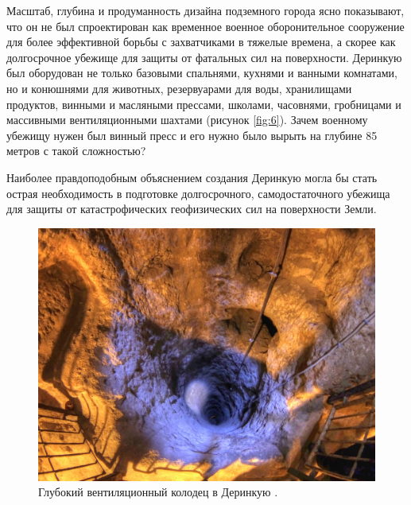 \documentclass[10pt,twocolumn,letterpaper]{article}
\begin{document}
Масштаб, глубина и продуманность дизайна подземного города ясно показывают, что он не был спроектирован как временное военное оборонительное сооружение для более эффективной борьбы с захватчиками в тяжелые времена, а скорее как долгосрочное убежище для защиты от фатальных сил на поверхности. Деринкую был оборудован не только базовыми спальнями, кухнями и ванными комнатами, но и конюшнями для животных, резервуарами для воды, хранилищами продуктов, винными и масляными прессами, школами, часовнями, гробницами и массивными вентиляционными шахтами (рисунок \ref{fig:6}). Зачем военному убежищу нужен был винный пресс и его нужно было вырыть на глубине 85 метров с такой сложностью?

Наиболее правдоподобным объяснением создания Деринкую могла бы стать острая необходимость в подготовке долгосрочного, самодостаточного убежища для защиты от катастрофических геофизических сил на поверхности Земли.

\begin{figure}[t]
\begin{center}
   \includegraphics[width=1\linewidth]{derinkuyu-air.jpg}
\end{center}
   \caption{Глубокий вентиляционный колодец в Деринкую \cite{53}.}
\label{fig:6}
\label{fig:onecol}
\end{figure}

\end{document}
